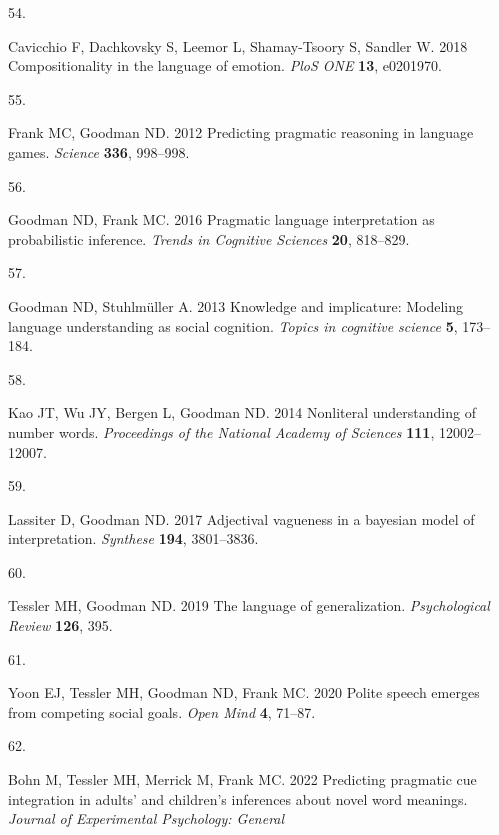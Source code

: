 \documentclass[
  man,floatsintext]{apa6}
\newlength{\cslhangindent}
\newlength{\csllabelwidth}
\newlength{\cslentryspacingunit} %
\newenvironment{CSLReferences}[2] %
 {%
  \setlength{\parindent}{0pt}
  \ifodd #1
  \let\oldpar\par
  \def\par{\hangindent=\cslhangindent\oldpar}
  \fi
  \setlength{\parskip}{#2\cslentryspacingunit}
 }%
 {}
\newcommand{\CSLLeftMargin}[1]{\parbox[t]{\csllabelwidth}{#1}}
\newcommand{\CSLRightInline}[1]{\parbox[t]{\linewidth - \csllabelwidth}{#1}\break}
\begin{document}
\begin{CSLReferences}{0}{0}
\leavevmode{}%
\CSLLeftMargin{54. }
\CSLRightInline{Cavicchio F, Dachkovsky S, Leemor L, Shamay-Tsoory S, Sandler W. 2018 Compositionality in the language of emotion. \emph{PloS ONE} \textbf{13}, e0201970.}

\leavevmode{}%
\CSLLeftMargin{55. }
\CSLRightInline{Frank MC, Goodman ND. 2012 Predicting pragmatic reasoning in language games. \emph{Science} \textbf{336}, 998--998.}

\leavevmode{}%
\CSLLeftMargin{56. }
\CSLRightInline{Goodman ND, Frank MC. 2016 Pragmatic language interpretation as probabilistic inference. \emph{Trends in Cognitive Sciences} \textbf{20}, 818--829.}

\leavevmode{}%
\CSLLeftMargin{57. }
\CSLRightInline{Goodman ND, Stuhlmüller A. 2013 Knowledge and implicature: Modeling language understanding as social cognition. \emph{Topics in cognitive science} \textbf{5}, 173--184.}

\leavevmode{}%
\CSLLeftMargin{58. }
\CSLRightInline{Kao JT, Wu JY, Bergen L, Goodman ND. 2014 Nonliteral understanding of number words. \emph{Proceedings of the National Academy of Sciences} \textbf{111}, 12002--12007.}

\leavevmode{}%
\CSLLeftMargin{59. }
\CSLRightInline{Lassiter D, Goodman ND. 2017 Adjectival vagueness in a bayesian model of interpretation. \emph{Synthese} \textbf{194}, 3801--3836.}

\leavevmode{}%
\CSLLeftMargin{60. }
\CSLRightInline{Tessler MH, Goodman ND. 2019 The language of generalization. \emph{Psychological Review} \textbf{126}, 395.}

\leavevmode{}%
\CSLLeftMargin{61. }
\CSLRightInline{Yoon EJ, Tessler MH, Goodman ND, Frank MC. 2020 Polite speech emerges from competing social goals. \emph{Open Mind} \textbf{4}, 71--87.}

\leavevmode{}%
\CSLLeftMargin{62. }
\CSLRightInline{Bohn M, Tessler MH, Merrick M, Frank MC. 2022 Predicting pragmatic cue integration in adults' and children's inferences about novel word meanings. \emph{Journal of Experimental Psychology: General} }


\end{CSLReferences}
\end{document}
